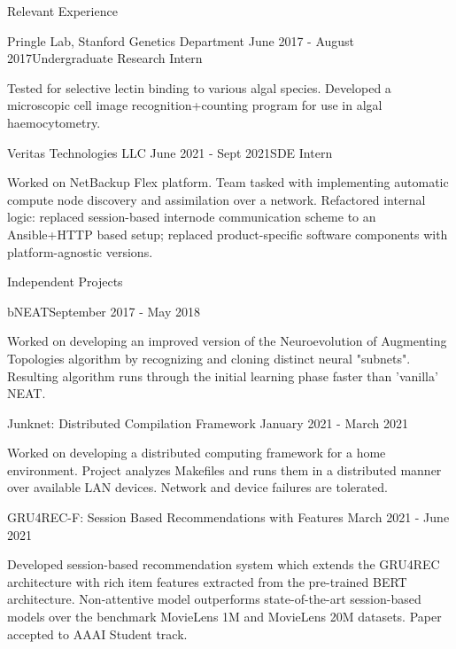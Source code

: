 \documentclass{resume} %
\begin{document}
\begin{resumeSection}{Relevant Experience} \itemsep -10pt

\begin{resumeSubsection}{Pringle Lab, Stanford Genetics Department}
	{June 2017 - August 2017}{Undergraduate Research Intern}{}
\item Tested for selective lectin binding to various algal species. Developed a
	microscopic cell image recognition+counting program for use in algal
	haemocytometry.
\end{resumeSubsection}
\begin{resumeSubsection}{Veritas Technologies LLC}
	{June 2021 - Sept 2021}{SDE Intern}{}
\item Worked on NetBackup Flex platform. Team tasked with implementing
	automatic compute node discovery and assimilation over a network.
	Refactored internal logic: replaced session-based internode
	communication scheme to an Ansible+HTTP based setup; replaced
	product-specific software components with platform-agnostic versions. 
\end{resumeSubsection}

\end{resumeSection}


\begin{resumeSection}{Independent Projects} \itemsep -10pt

\begin{resumeSubsection}{bNEAT}{September 2017 - May 2018}{}{}
\item Worked on developing an improved version of the Neuroevolution of
	Augmenting Topologies algorithm by recognizing and cloning distinct
	neural "subnets". Resulting algorithm runs through the initial learning
	phase faster than 'vanilla' NEAT.
\end{resumeSubsection}
\begin{resumeSubsection}{Junknet: Distributed Compilation Framework}
	{January 2021 - March 2021}{}{}
\item Worked on developing a distributed computing framework for a home
	environment. Project analyzes Makefiles and runs them in a distributed
	manner over available LAN devices. Network and device failures are
	tolerated.
\end{resumeSubsection}
\begin{resumeSubsection}{GRU4REC-F: Session Based Recommendations with Features}
	{March 2021 - June 2021}{}{}
\item Developed session-based recommendation system which extends the GRU4REC
	architecture with rich item features extracted from the pre-trained
	BERT architecture. Non-attentive model outperforms state-of-the-art
	session-based models over the benchmark MovieLens 1M and MovieLens 20M
	datasets. Paper accepted to AAAI Student track. 
\end{resumeSubsection}

\end{resumeSection}
\end{document}

